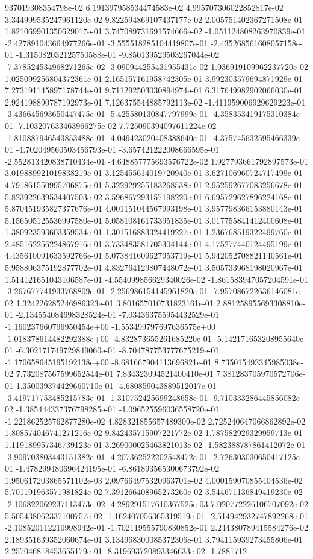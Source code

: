 937019308354798e-02	6.191397958534474583e-02	4.995707306022852817e-02	3.344999535247961120e-02	9.822594869107437177e-02	2.005751402367271508e-01	1.821069901350629017e-01	3.747089731691574666e-02	-1.051124808263970839e-01	-2.427891043664977266e-01	-3.555518285104419807e-01	-2.435268561608057158e-01	-1.315082032125750588e-01	-9.850139529503267044e-02	-7.378524534968271265e-02	-3.090944255431955431e-02	1.936919109962237720e-02	1.025099256804372361e-01	2.165157161958742305e-01	3.992303579694871929e-01	7.273191145897178744e-01	9.711292503030894974e-01	6.317649982902066030e-01	2.924198890787192973e-01	7.126375544885792113e-02	-1.411959006929629223e-01	-3.436645693650447475e-01	-5.425580130847797999e-01	-4.358353419175310384e-01	-7.103207633463966275e-02	7.725090394097611224e-02	-1.810887946543853488e-01	-4.049423020408388640e-01	-4.375745632595466339e-01	-4.702049560503456793e-01	-3.657421222008666595e-01	-2.552813420838710434e-01	-4.648857775693576722e-02	1.927793661792897573e-01	3.019889921019838219e-01	3.125455614019720940e-01	3.627106960724717499e-01	4.791861550995706875e-01	5.322929255183268538e-01	2.952592677083256678e-01	5.823922639534407503e-02	3.596867293157198220e-01	6.695729627896224168e-01	5.870451935827377676e-01	4.001151044567993198e-01	3.957798366153880143e-01	5.156505125536997580e-01	5.058108161733951835e-01	3.017755841412400608e-01	1.380923593603359534e-01	1.301516883324419227e-01	1.236768519322499760e-01	2.485162256224867916e-01	3.733483581705304144e-01	4.175277440124495199e-01	4.435610091633592766e-01	5.073841609627953719e-01	5.942052708821140561e-01	5.958806375192877702e-01	4.832764129807448072e-01	3.505733968198020967e-01	1.514121651043106587e-01	-4.554099856629340026e-02	-1.861583947057204591e-01	-3.267677741933768809e-01	-2.256986154145961820e-01	-7.957086722636146081e-02	1.324226285246986323e-01	3.801657010731823161e-01	2.881258955693308810e-01	-2.134554084698328524e-01	-7.034363755954432529e-01	-1.160237660796950454e+00	-1.553499797697636575e+00	-1.018378614482292388e+00	-4.832873655261685220e-01	-5.142171653208955640e-01	-6.302171749729849060e-01	-8.704787753777675219e-01	-1.170658645195192138e+00	-8.681667904113696821e-01	8.735015493345985038e-02	7.732087567599652544e-01	7.834323094521400410e-01	7.381283705970572706e-01	1.350039374429660710e-01	-4.680859043889512017e-01	-3.419717753485215783e-01	-1.310752425699248658e-01	-9.710333286445856082e-02	-1.385444337376798285e-01	-1.096525596036558720e-01	-1.221862525762877280e-02	4.828321855657489309e-02	2.725240647066862892e-02	1.808574046741271216e-02	9.842435715907221772e-02	1.787582929329959713e-01	1.119189957346739123e-01	3.269000025463821013e-02	-1.582388787861412072e-01	-3.909703803443151382e-01	-4.207362522202548472e-01	-2.726303030650417125e-01	-1.478299480696424195e-01	-6.861893565300673792e-02	1.950617203865571102e-03	2.097664975320963701e-02	4.000159070855404536e-02	5.701191963571981824e-02	7.391266408965273260e-02	3.544671136849419230e-02	-2.106822069237113473e-02	-4.289291517610367525e-03	7.020772226106707092e-02	5.505438062337100757e-02	-1.162407056365319519e-01	-2.514942932747892268e-01	-2.108520112210998942e-01	-1.702119555790830852e-01	2.244380789415584276e-02	2.189351639352060674e-01	3.134968300085372306e-01	3.794115939273455806e-01	2.257046818453655179e-01	-8.319693720893346633e-02	-1.7881712